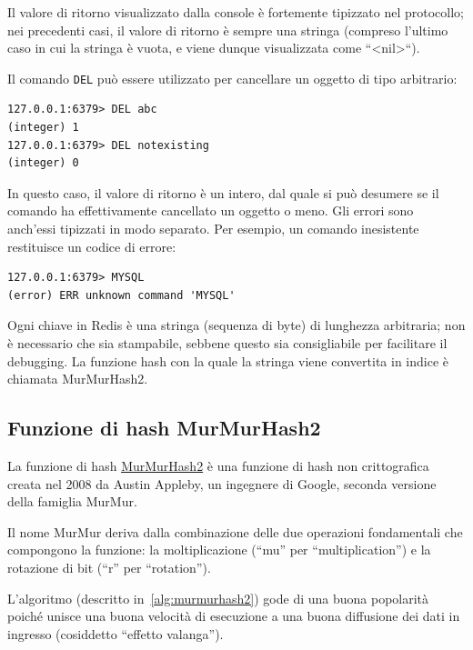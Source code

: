 Il valore di ritorno visualizzato dalla console è fortemente tipizzato nel protocollo;
nei precedenti casi, il valore di ritorno è sempre una stringa (compreso l'ultimo
caso in cui la stringa è vuota, e viene dunque visualizzata come ``<nil>``).

Il comando \verb|DEL| può essere utilizzato per cancellare un oggetto di tipo
arbitrario:

\medskip
\begin{lstlisting}
127.0.0.1:6379> DEL abc
(integer) 1
127.0.0.1:6379> DEL notexisting
(integer) 0
\end{lstlisting}

In questo caso, il valore di ritorno è un intero, dal quale si può desumere se il comando
ha effettivamente cancellato un oggetto o meno. Gli errori sono anch'essi tipizzati in
modo separato. Per esempio, un comando inesistente restituisce un codice di errore:

\medskip
\begin{lstlisting}
127.0.0.1:6379> MYSQL
(error) ERR unknown command 'MYSQL'
\end{lstlisting}

Ogni chiave in Redis è una stringa (sequenza di byte) di lunghezza arbitraria; non è
necessario che sia stampabile, sebbene questo sia consigliabile per facilitare il
debugging. La funzione hash con la quale la stringa viene convertita in indice è
chiamata MurMurHash2.

\subsection{Funzione di hash MurMurHash2}

La funzione di hash \href{https://sites.google.com/site/murmurhash/}{MurMurHash2} è una funzione di
hash non crittografica creata nel 2008 da Austin Appleby, un ingegnere di Google, seconda versione
della famiglia MurMur.

Il nome MurMur deriva dalla combinazione delle due operazioni fondamentali che compongono la
funzione: la moltiplicazione (``mu'' per ``multiplication'') e la rotazione di bit (``r'' per
``rotation''). 

L'algoritmo (descritto in~\ref{alg:murmurhash2}) gode di una buona popolarità poiché unisce una
buona velocità di esecuzione a una buona diffusione dei dati in ingresso (cosiddetto ``effetto
valanga'').

